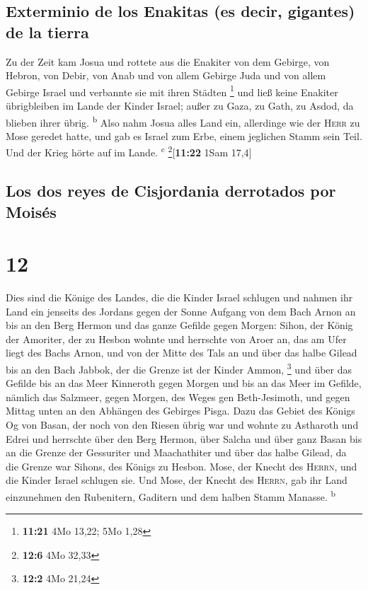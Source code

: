\hypertarget{exterminio-de-los-enakitas-es-decir-gigantes-de-la-tierra}{%
\subsection{Exterminio de los Enakitas (es decir, gigantes) de la
tierra}\label{exterminio-de-los-enakitas-es-decir-gigantes-de-la-tierra}}

 Zu der Zeit kam Josua und rottete aus die Enakiter von
dem Gebirge, von Hebron, von Debir, von Anab und von allem Gebirge Juda
und von allem Gebirge Israel und verbannte sie mit ihren Städten
\footnote{\textbf{11:21} 4Mo 13,22; 5Mo 1,28}  und ließ
keine Enakiter übrigbleiben im Lande der Kinder Israel; außer zu Gaza,
zu Gath, zu Asdod, da blieben ihrer übrig. \textsuperscript{b}
 Also nahm Josua alles Land ein, allerdinge wie der
\textsc{Herr} zu Mose geredet hatte, und gab es Israel zum Erbe, einem
jeglichen Stamm sein Teil. Und der Krieg hörte auf im Lande.
\textsuperscript{c} \footnote{\textbf{12:6} 4Mo 32,33}{[}\textbf{11:22}
1Sam 17,4{]}

\hypertarget{los-dos-reyes-de-cisjordania-derrotados-por-moisuxe9s}{%
\subsection{Los dos reyes de Cisjordania derrotados por
Moisés}\label{los-dos-reyes-de-cisjordania-derrotados-por-moisuxe9s}}

\hypertarget{section-11}{%
\section{12}\label{section-11}}

 Dies sind die Könige des Landes, die die Kinder Israel
schlugen und nahmen ihr Land ein jenseits des Jordans gegen der Sonne
Aufgang von dem Bach Arnon an bis an den Berg Hermon und das ganze
Gefilde gegen Morgen:  Sihon, der König der Amoriter, der
zu Hesbon wohnte und herrschte von Aroer an, das am Ufer liegt des Bachs
Arnon, und von der Mitte des Tals an und über das halbe Gilead bis an
den Bach Jabbok, der die Grenze ist der Kinder Ammon, \footnote{\textbf{12:2}
  4Mo 21,24}  und über das Gefilde bis an das Meer
Kinneroth gegen Morgen und bis an das Meer im Gefilde, nämlich das
Salzmeer, gegen Morgen, des Weges gen Beth-Jesimoth, und gegen Mittag
unten an den Abhängen des Gebirges Pisga.  Dazu das Gebiet
des Königs Og von Basan, der noch von den Riesen übrig war und wohnte zu
Astharoth und Edrei  und herrschte über den Berg Hermon,
über Salcha und über ganz Basan bis an die Grenze der Gessuriter und
Maachathiter und über das halbe Gilead, da die Grenze war Sihons, des
Königs zu Hesbon.  Mose, der Knecht des \textsc{Herrn},
und die Kinder Israel schlugen sie. Und Mose, der Knecht des
\textsc{Herrn}, gab ihr Land einzunehmen den Rubenitern, Gaditern und
dem halben Stamm Manasse. \textsuperscript{b}

